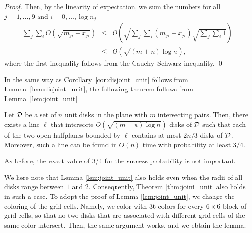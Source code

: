 \documentclass{llncs}
\begin{document}
\begin{proof}
Then, by the linearity of expectation,
we sum the numbers for all $j=1, \ldots, 9$ and $i = 0, \ldots, \log n_j$:
\begin{eqnarray*}
\sum_j \sum_i O(\sqrt{m_{ji} + x_{ji}})
 &\leq& O\left(\sqrt{\sum_j \sum_i (m_{ji} + x_{ji})} \sqrt{\sum_j \sum_i 1}\right)\\
 &\leq& O(\sqrt{(m+n)\log n}),
\end{eqnarray*}
where the first inequality follows from the Cauchy--Schwarz inequality. 
\qed
\end{proof}

In the same way as Corollary~\ref{cor:disjoint_unit} follows from Lemma~\ref{lem:disjoint_unit}, the following theorem follows from Lemma~\ref{lem:joint_unit}.

\begin{theorem}
\label{thm:joint_unit}
Let $\cal{D}$ be a set of $n$ unit disks in the plane with $m$ intersecting pairs.
Then, there exists a line $\ell$ that intersects $O(\sqrt{(m+n)\log n})$ disks
of ${\cal D}$ such that each of the two open halfplanes bounded by $\ell$ contains
at most $2n/3$ disks of ${\cal D}$.
Moreover, such a line can be found in $O(n)$ time with probability at least $3/4$.
\end{theorem}

As before, the exact value of $3/4$ for the success probability is not important.

We here note that Lemma \ref{lem:joint_unit} 
also holds 
even when the radii of all disks range between $1$ and $2$.
Consequently,  Theorem \ref{thm:joint_unit} also holds in such a case.
To adopt the proof of Lemma \ref{lem:joint_unit},
we change the coloring of the grid cells.
Namely, we color with 36 colors for every $6\times 6$ block of grid cells,
so that no two disks that are associated with different grid cells of the same
color intersect.
Then, the same argument works, and we obtain the lemma.
\end{document}
